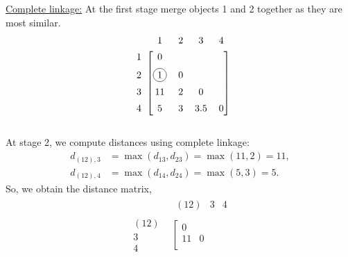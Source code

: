 \documentclass[addpoints,answers,a4paper,11pt]{exam}
\newcommand*\circled[1]{\tikz[baseline=(char.base)]{
    \node[shape=circle, draw, inner sep=2pt] (char) {#1};}}
\begin{document}
\begin{questions}
\begin{parts}
\begin{solution}
         \underline{Complete linkage:}
         At the first stage merge objects 1 and 2 together as they are most similar. \\
         \[
            \begin{blockarray}{ccccc}
         & 1 & 2 & 3 & 4  \\
         \begin{block}{c[cccc]}
            \addlinespace
            1 & 0 &   &   &   \\
            \addlinespace
            2 & \circled{1} & 0 &   &   \\
            \addlinespace
            3 & 11& 2 & 0 &   \\
            \addlinespace
            4 & 5 & 3 & 3.5 & 0  \\
            \addlinespace
         \end{block}
            \end{blockarray}
         \]
         At stage 2, we compute distances using complete linkage:
         \begin{align*}
            d_{(12),3} &= \max(d_{13}, d_{23}) = \max(11, 2) = 11,\\
            d_{(12),4} &= \max(d_{14}, d_{24}) = \max(5, 3) = 5.
         \end{align*}
         So, we obtain the distance matrix,
         \[
            \begin{array}{cc}
               & \begin{array}{ccc} (12) & 3 & 4 \end{array} \\
               \begin{array}{c} (12) \\ 3 \\ 4 \end{array} &
               \left[ \begin{array}{ccc}
                     0 & & \\
                     11 & 0 & \\

\end{array}
\end{array}\]
\end{solution}
\end{parts}
\end{questions}
\end{document}
